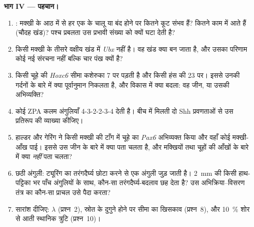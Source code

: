 \begin{problem}
\medskip
\noindent\textbf{भाग IV --- पहचान।}
\begin{enumerate}[resume]
  \item {}: मक्खी के आठ  में से हर एक के चालू या बंद
        होने पर कितने कूट संभव हैं? कितने काम में आते हैं (चौदह खंड)?
        पश्च प्रबलता उस प्रभावी संख्या को क्यों घटा देती है?
  \item किसी मक्खी के तीसरे वक्षीय खंड में \emph{Ubx} नहीं है। वह खंड
        क्या बन जाता है, और उसका परिणाम कोई नई संरचना नहीं बल्कि चार
        पंख क्यों है?
  \item किसी चूहे की \emph{Hoxc6} सीमा कशेरुका 7 पर पड़ती है और किसी
        हंस की 23 पर। इससे उनकी गर्दनों के बारे में क्या पूर्वानुमान
        निकलता है, और विकास में क्या बदला: वह जीन, या उसकी
        अभिव्यक्ति?
  \item कोई ZPA कलम अंगुलियाँ 4-3-2-2-3-4 देती है। बीच में मिलती दो
        Shh प्रवणताओं से उस प्रतिरूप की व्याख्या कीजिए।
  \item हाल्डर और गेरिंग ने किसी मक्खी की टाँग में चूहे का \emph{Pax6}
        अभिव्यक्त किया और वहाँ कोई मक्खी-आँख पाई। इससे उस जीन के बारे
        में क्या पता चलता है, और मक्खियों तथा चूहों की आँखों के बारे
        में क्या \emph{नहीं} पता चलता?
  \item छठी अंगुली: ट्यूरिंग का तरंगदैर्घ्य छोटा करने से एक अंगुली जुड़
        जाती है। \qty{2}{mm} की किसी हाथ-पट्टिका भर पाँच अंगुलियों के
        साथ, कौन-सा तरंगदैर्घ्य-बदलाव छह देता है? उस अभिक्रिया--विसरण
        तंत्र का कौन-सा प्राचल उसे पैदा करता?
  \item सारांश दीजिए: $\lambda$ (प्रश्न~2), स्रोत के दुगुने होने पर
        सीमा का खिसकाव (प्रश्न~8), और \qty{10}{\%} शोर से आती स्थानिक
        त्रुटि (प्रश्न~10)।
\end{enumerate}
\end{problem}
